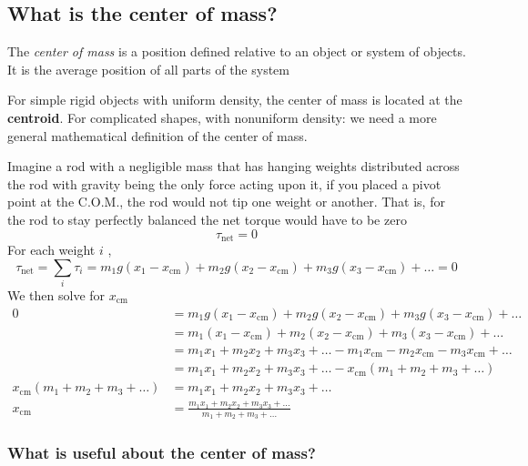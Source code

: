 \subsection{What is the center of mass?}

The \emph{center of mass} is a position defined relative to an object or
system of objects.  It is the average position of all parts of the
system

For simple rigid objects with uniform density, the center of mass is
located at the \textbf{centroid}.  For complicated shapes, with
nonuniform density:  we need a more general mathematical definition of
the center of mass.

Imagine a rod with a negligible mass that has hanging weights
distributed across the rod with gravity being the only force acting upon
it, if you placed a pivot point at the C.O.M., the rod would not tip one
weight or another.  That is, for the rod to stay perfectly balanced the
net torque would have to be zero
\begin{equation}
    \tau_\mathrm{net} = 0
\end{equation}
For each weight
$
    i
$%
,
\begin{equation}
    \tau_\mathrm{net} = \sum_i \tau_i = m_1g(x_1-x_\mathrm{cm})+m_2g(x_2-x_\mathrm
    {cm})+m_3g(x_3-x_\mathrm{cm}) + \dots = 0
\end{equation}
We then solve for
$
    x_\mathrm{cm}
$
\begin{align}
    0 &= m_1g(x_1-x_\mathrm{cm})+m_2g(x_2-x_\mathrm{cm})+m_3g(x_3-x_\mathrm
    {cm}) + \dots \\
    &= m_1(x_1-x_\mathrm{cm})+m_2(x_2-x_\mathrm{cm})+m_3(x_3-x_\mathrm{cm})
    + \dots \\
    &= m_1x_1 + m_2x_2 + m_3x_3 + \dots - m_1x_\mathrm{cm} -m_2x_\mathrm
    {cm} - m_3x_\mathrm{cm} + \dots \\
    &= m_1x_1 + m_2x_2 + m_3x_3 + \dots - x_\mathrm{cm}(m_1 + m_2 + m_3
    + \dots) \\
    x_\mathrm{cm}(m_1 + m_2 + m_3 + \dots) &= m_1x_1 + m_2x_2 + m_3x_3 +
    \dots \\
    x_\mathrm{cm} &= \frac{m_1x_1 + m_2x_2 + m_3x_3 + \dots}{m_1 + m_2 +
    m_3 + \dots}
\end{align}

\subsubsection{What is useful about the center of mass?}

